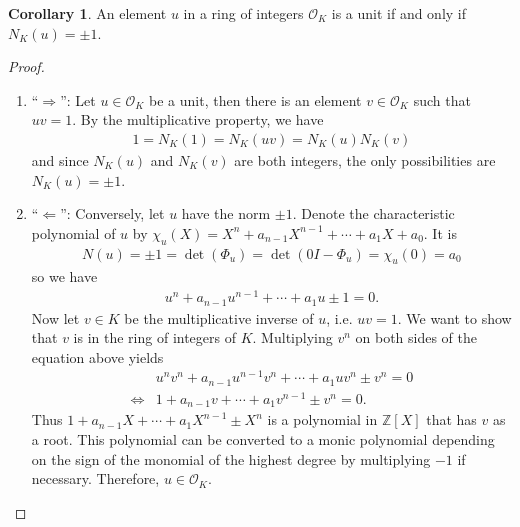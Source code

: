 \documentclass[a4paper]{book}
\theoremstyle{definition}
\newtheorem{corollary}{Corollary}
\begin{document}
\begin{thmbox}
    \begin{corollary}
        An element \(u\) in a ring of integers \(\mathcal{O}_K\) is a unit if and only if \(N_K(u) = \pm 1\).
    \end{corollary}
\end{thmbox}
\begin{proof}
    \begin{enumerate}
        \item ``\(\Rightarrow\)'': Let \(u \in \mathcal{O}_K\) be a unit, then there is an element \(v \in \mathcal{O}_K\) such that \(uv = 1\). By the multiplicative property, we have
        \begin{align*}
            1 = N_K(1) = N_K(uv) = N_K(u)N_K(v)
        \end{align*}
        and since \(N_K(u)\) and \(N_K(v)\) are both integers, the only possibilities are \(N_K(u) = \pm 1\).
        \item ``\(\Leftarrow\)'': Conversely, let \(u\) have the norm \(\pm 1\). Denote the characteristic polynomial of \(u\) by \(\chi_u (X) = X^n + a_{n-1} X^{n-1} + \cdots + a_1 X + a_0\). It is
        \begin{align*}
            N(u) = \pm 1 = \det (\Phi_u) = \det(0 I - \Phi_u) = \chi_u (0) = a_0
        \end{align*}
        so we have
        \begin{align*}
            u^n + a_{n-1} u^{n-1} + \cdots + a_1 u \pm 1 = 0 \text{.}
        \end{align*}
        Now let \(v \in K\) be the multiplicative inverse of \(u\), i.e. \(uv = 1\). We want to show that \(v\) is in the ring of integers of \(K\). Multiplying \(v^n\) on both sides of the equation above yields
        \begin{align*}
            & u^n v^n + a_{n-1} u^{n-1} v^n + \cdots + a_1 u v^n \pm v^n = 0 \\
            \iff & 1 + a_{n-1} v + \cdots + a_1 v^{n-1} \pm v^n = 0 \text{.}
        \end{align*}
        Thus \(1 + a_{n-1} X + \cdots + a_1 X^{n-1} \pm X^n\) is a polynomial in \(\mathbb{Z}[X]\) that has \(v\) as a root. This polynomial can be converted to a monic polynomial depending on the sign of the monomial of the highest degree by multiplying \(-1\) if necessary. Therefore, \(u \in \mathcal{O}_K\).
    \end{enumerate}
\end{proof}
\end{document}
